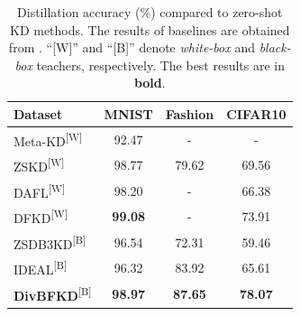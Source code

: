 \begin{table}
    \caption{Distillation accuracy (\%) compared to zero-shot KD methods. The results of baselines are obtained from \cite{wang2021zero,zhang2022ideal}. ``[W]'' and ``[B]'' denote \textit{white-box} and \textit{black-box} teachers, respectively. The best results are in \textbf{bold}.}
    \label{ch3:tab:Classification-data-free}
    \centering
    \begin{tabular}{|l|c|c|c|}
        \hline
        \textbf{Dataset} & \textbf{MNIST} & \textbf{Fashion} & \textbf{CIFAR10} \\
        \hline
        Meta-KD\textsuperscript{[W]}          & 92.47          & -              & - \\
        ZSKD\textsuperscript{[W]}             & 98.77          & 79.62          & 69.56 \\
        DAFL\textsuperscript{[W]}             & 98.20          & -              & 66.38 \\
        DFKD\textsuperscript{[W]}             & \textbf{99.08} & -              & 73.91 \\
        ZSDB3KD\textsuperscript{[B]}          & 96.54          & 72.31          & 59.46 \\
        IDEAL\textsuperscript{[B]}            & 96.32          & 83.92          & 65.61 \\
        \textbf{DivBFKD}\textsuperscript{[B]} & \textbf{98.97} & \textbf{87.65} & \textbf{78.07} \\
    \end{tabular}
\end{table}
